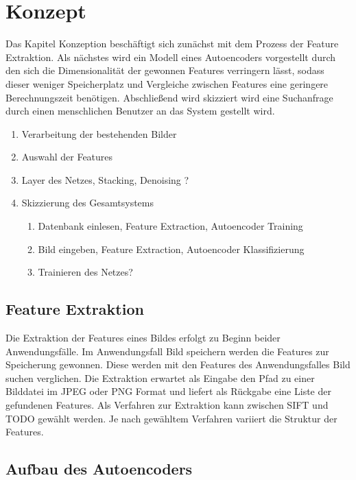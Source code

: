 \chapter{Konzept}

Das Kapitel Konzeption beschäftigt sich zunächst mit dem Prozess der Feature Extraktion. Als nächstes wird ein Modell eines Autoencoders vorgestellt durch den sich die Dimensionalität der gewonnen Features verringern lässt, sodass dieser weniger Speicherplatz und Vergleiche zwischen Features eine geringere Berechnungszeit benötigen. Abschließend wird skizziert wird eine Suchanfrage durch einen menschlichen Benutzer an das System gestellt wird.

\begin{enumerate}
	\item Verarbeitung der bestehenden Bilder
	\item Auswahl der Features
	\item Layer des Netzes, Stacking, Denoising ?
	\item Skizzierung des Gesamtsystems \begin{enumerate}
		\item Datenbank einlesen, Feature Extraction, Autoencoder Training
		\item Bild eingeben, Feature Extraction, Autoencoder Klassifizierung
		\item Trainieren des Netzes?
	\end{enumerate}		
	
\end{enumerate}

\section{Feature Extraktion}

Die Extraktion der Features eines Bildes erfolgt zu Beginn beider Anwendungsfälle. Im Anwendungsfall Bild speichern werden die Features zur Speicherung gewonnen. Diese werden mit den Features des Anwendungsfalles Bild suchen verglichen. Die Extraktion erwartet als Eingabe den Pfad zu einer Bilddatei im JPEG oder PNG Format und liefert als Rückgabe eine Liste der gefundenen Features.  Als Verfahren zur Extraktion kann zwischen SIFT und TODO gewählt werden. Je nach gewähltem Verfahren variiert die Struktur der Features.

\section{Aufbau des Autoencoders}

